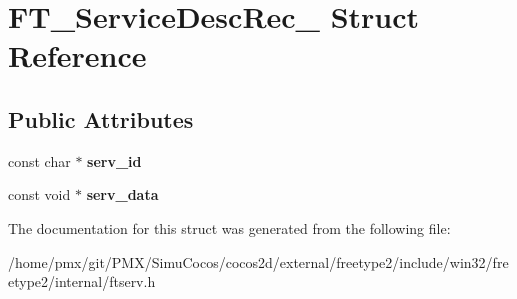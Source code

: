 \hypertarget{structFT__ServiceDescRec__}{}\section{F\+T\+\_\+\+Service\+Desc\+Rec\+\_\+ Struct Reference}
\label{structFT__ServiceDescRec__}
\subsection*{Public Attributes}
\begin{DoxyCompactItemize}
\item 
\mbox{\label{structFT__ServiceDescRec___a65866a847ba2621d00a2175839b2f0a6}} 
const char $\ast$ {\bfseries serv\+\_\+id}
\item 
\mbox{\label{structFT__ServiceDescRec___a7ed524fe3aa675d127ad163400cad548}} 
const void $\ast$ {\bfseries serv\+\_\+data}
\end{DoxyCompactItemize}


The documentation for this struct was generated from the following file\+:\begin{DoxyCompactItemize}
\item 
/home/pmx/git/\+P\+M\+X/\+Simu\+Cocos/cocos2d/external/freetype2/include/win32/freetype2/internal/ftserv.\+h\end{DoxyCompactItemize}
